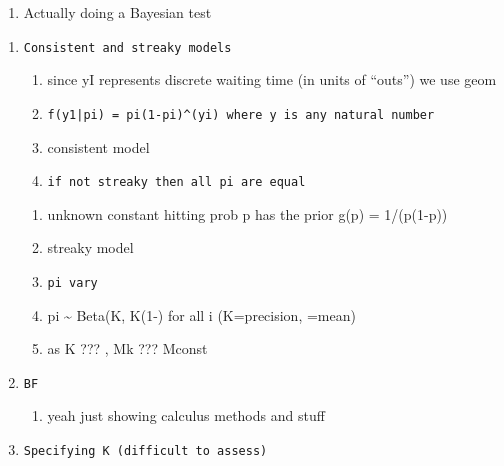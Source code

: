 \documentclass[12pt,twoside]{dukestatscithesis}
\providecommand{\tightlist}{%
  \setlength{\itemsep}{0pt}\setlength{\parskip}{0pt}}
\theoremstyle{definition}
\theoremstyle{definition}
\theoremstyle{definition}
\theoremstyle{remark}
\begin{document}
\begin{enumerate}
\def\labelenumi{\Alph{enumi}.}
\setcounter{enumi}{2}
\tightlist
\item
  Actually doing a Bayesian test
\end{enumerate}
\begin{enumerate}
\def\labelenumi{\arabic{enumi}.}
\item
\begin{verbatim}
Consistent and streaky models
\end{verbatim}
  \begin{enumerate}
  \def\labelenumii{\alph{enumii}.}
  \item
    since yI represents discrete waiting time (in units of ``outs'') we
    use geom
  \item
\begin{verbatim}
f(y1|pi) = pi(1-pi)^(yi) where y is any natural number
\end{verbatim}
  \item
    consistent model
  \item
\begin{verbatim}
if not streaky then all pi are equal
\end{verbatim}
  \end{enumerate}
  \begin{enumerate}
  \def\labelenumii{\roman{enumii}.}
  \setcounter{enumii}{1}
  \item
    unknown constant hitting prob p has the prior g(p) = 1/(p(1-p))
  \item
    streaky model
  \item
\begin{verbatim}
pi vary
\end{verbatim}
  \item
    pi \textasciitilde{} Beta(K\eta, K(1-\eta) for all i (K=precision,
    \eta=mean)
  \item
    as K ??? \inf, Mk ??? Mconst
  \end{enumerate}
\item
\begin{verbatim}
BF
\end{verbatim}
  \begin{enumerate}
  \def\labelenumii{\alph{enumii}.}
  \tightlist
  \item
    yeah just showing calculus methods and stuff
  \end{enumerate}
\item
\begin{verbatim}
Specifying K (difficult to assess)

\end{verbatim}
\end{enumerate}
\end{document}
